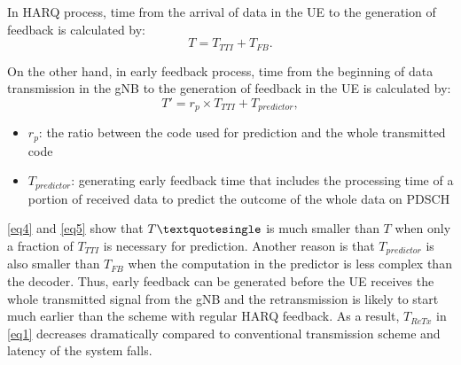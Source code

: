 \documentclass[conference]{IEEEtran}
\begin{document}
In HARQ process, time from the arrival of data in the UE to the generation of feedback is calculated by:
\begin{equation}
T = T_{TTI} + T_{FB}\label{eq4}.
\end{equation}

On the other hand, in early feedback process, time from the beginning of data transmission in the gNB to the generation of feedback in the UE is calculated by:
\begin{equation}
T' = r_{p}\times T_{TTI} + T_{predictor}\label{eq5},
\end{equation}
\begin{itemize}
    \item $r_{p}$: the ratio between the code used for prediction and the whole transmitted code
    \item $T_{predictor}$: generating early feedback time that includes the processing time of a portion of received data to predict the outcome of the whole data on PDSCH
\end{itemize}

\eqref{eq4} and \eqref{eq5} show that $T\textquotesingle$ is much smaller than $T$ when only a fraction of $T_{TTI}$ is necessary for prediction. Another reason is that $T_{predictor}$ is also smaller than $T_{FB}$ when the computation in the predictor is less complex than the decoder. Thus, early feedback can be generated before the UE receives the whole transmitted signal from the gNB and the retransmission is likely to start much earlier than the scheme with regular HARQ feedback. As a result, $T_{ReTx}$ in \eqref{eq1} decreases dramatically compared to conventional transmission scheme and latency of the system falls. 
\end{document}
